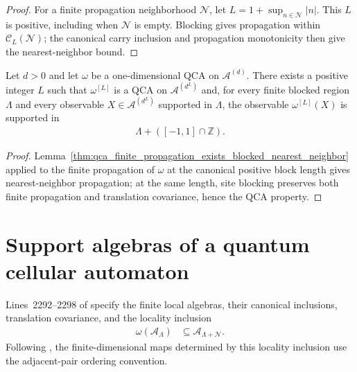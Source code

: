 \begin{proof}\leanok
    For a finite propagation neighborhood $\mathcal N$, let
    $L=1+\sup_{n\in\mathcal N}|n|$.  This $L$ is positive, including when
    $\mathcal N$ is empty.  Blocking gives propagation within
    $\mathcal C_L(\mathcal N)$; the canonical carry inclusion and propagation
    monotonicity then give the nearest-neighbor bound.
\end{proof}

\begin{lemma}
    \label{thm:qca_exists_blocked_nearest_neighbor}
    \leanok
    Let $d>0$ and let $\omega$ be a one-dimensional QCA on
    $\mathcal A^{(d)}$.  There exists a positive integer $L$ such that
    $\omega^{[L]}$ is a QCA on $\mathcal A^{(d^L)}$ and, for every finite
    blocked region $\Lambda$ and every observable
    $X\in\mathcal A^{(d^L)}$ supported in $\Lambda$, the observable
    $\omega^{[L]}(X)$ is supported in
    \begin{align}
        \Lambda+([-1,1]\cap\mathbb Z).
    \end{align}
\end{lemma}

\begin{proof}\leanok
    Lemma~\ref{thm:qca_finite_propagation_exists_blocked_nearest_neighbor} applied
    to the finite propagation of $\omega$ at
    the canonical positive block length gives nearest-neighbor propagation; at the same length, site blocking
    preserves both finite propagation and translation covariance, hence the
    QCA property.
\end{proof}

\section{Support algebras of a quantum cellular automaton}

Lines~2292--2298 of \cite{Cirac2017MPU} specify the finite local
algebras, their canonical inclusions, translation covariance, and the locality
inclusion
\begin{align}
    \omega(\mathcal A_\Lambda)
     & \subseteq \mathcal A_{\Lambda+\mathcal N}.
\end{align}
Following \cite{Gross2012IndexTheory}, the finite-dimensional maps determined by this locality inclusion use the
adjacent-pair ordering convention.

